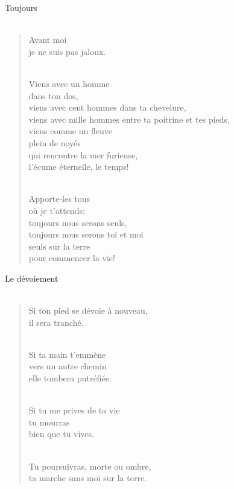 \documentclass[11pt,a4paper]{book}
\begin{document}
{\huge Toujours} \\ \\

\begin{verse}
Avant moi \\
je ne suis pas jaloux. \\ \

Viens avec un homme \\
dans ton dos, \\
viens avec cent hommes dans ta chevelure, \\
viens avec mille hommes entre ta poitrine et tes pieds, \\
viens comme un fleuve \\
plein de noyés \\
qui rencontre la mer furieuse, \\
l'écume éternelle, le temps! \\ \

Apporte-les tous \\
où je t'attends: \\
toujours nous serons seuls, \\
toujours nous serons toi et moi \\
seuls sur la terre \\
pour commencer la vie!
\end{verse}

\newpage

{\huge Le dévoiement} \\ \\

\begin{verse}
Si ton pied se dévoie à nouveau, \\
il sera tranché. \\ \

Si ta main t'emmène \\
vers un autre chemin \\
elle tombera putréfiée. \\ \

Si tu me prives de ta vie \\
tu mourras \\
bien que tu vives. \\ \

Tu poursuivras, morte ou ombre, \\
ta marche sans moi sur la terre.
\end{verse}
\end{document}
